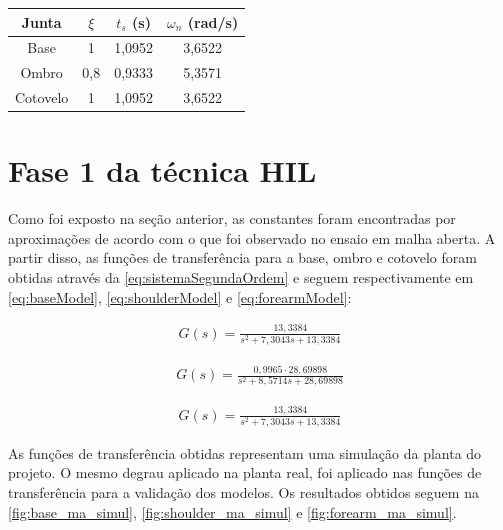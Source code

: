 \begin{center}
    \begin{tabular}{| c | c | c | c |}\hline
      \textbf{Junta}	& $\xi$ 	& $t_s$ (s)	& $\omega_n$ (rad/s)	\\ \hline
      Base		& 1 		& 1,0952	& 3,6522		\\ \hline
      Ombro		& 0,8 		& 0,9333	& 5,3571		\\ \hline
      Cotovelo		& 1 		& 1,0952	& 3,6522		\\ \hline
    \end{tabular}
    \label{tab:ctesModeloMA}
\end{center}

\section{Fase 1 da técnica HIL}

Como foi exposto na seção anterior, as constantes foram encontradas por aproximações de acordo
com o que foi observado no ensaio em malha aberta. A partir disso, as funções de transferência
para a base, ombro e cotovelo foram obtidas através da \autoref{eq:sistemaSegundaOrdem} e 
seguem respectivamente em \eqref{eq:baseModel}, \eqref{eq:shoulderModel} e \eqref{eq:forearmModel}:

\begin{equation}
  \begin{gathered}
    G(s) = \frac{13,3384}{s^2 + 7,3043s + 13,3384}
  \end{gathered}
  \label{eq:baseModel}
\end{equation}

\begin{equation}
  \begin{gathered}
    G(s) = \frac{0,9965 \cdot 28,69898}{s^2 + 8,5714s + 28,69898}
  \end{gathered}
  \label{eq:shoulderModel}
\end{equation}

\begin{equation}
  \begin{gathered}
   G(s) = \frac{13,3384}{s^2 + 7,3043s + 13,3384}
  \end{gathered}
  \label{eq:forearmModel}
\end{equation}

As funções de transferência obtidas representam uma simulação da planta do projeto.
O mesmo degrau aplicado na planta real, foi aplicado nas funções de transferência para
a validação dos modelos. Os resultados obtidos seguem na \autoref{fig:base_ma_simul}, 
\ref{fig:shoulder_ma_simul} e \ref{fig:forearm_ma_simul}.

